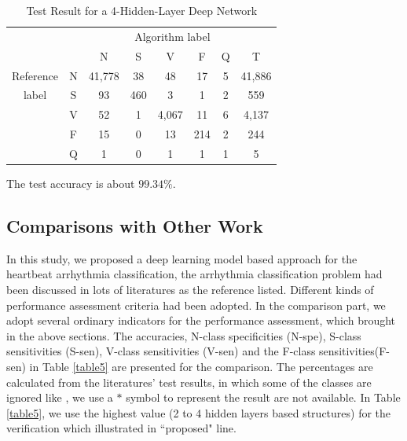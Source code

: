 \documentclass[journal]{IEEEtran}
\begin{document}
\begin{table}[!htbp]
\begin{center}
\begin{threeparttable}
\caption{Test Result for a 4-Hidden-Layer Deep Network}
\label{table4}
\begin{tabular}{cccccccc}
\hline
\multicolumn{6}{r}{Algorithm label} \\
\cline{3-7}
		&  & N & S      & V    & F     & Q   & T\\
\hline
 Reference & N & 41,778 &  38  &  48   & 17  & 5  &  41,886 \\
	label  & S &  93    & 460  &   3   & 1   & 2  &  559\\
		   & V &  52    & 1    & 4,067 & 11  & 6  &  4,137\\
		   & F &  15    & 0    & 13    & 214 & 2  &  244\\
		   & Q &  1     & 0    & 1     & 1   & 1  &  5\\
\hline
\end{tabular}
\begin{tablenotes}
\item The test accuracy is about $99.34\%$.
\end{tablenotes}
\end{threeparttable}
\end{center}
\end{table}


\subsection{Comparisons with Other Work}
In this study, we proposed a deep learning model based approach for the heartbeat arrhythmia classification, the arrhythmia classification problem had been discussed in lots of literatures as the reference listed. Different kinds of performance assessment criteria had been adopted. In the comparison part, we adopt several ordinary indicators for the performance assessment, which brought in the above sections. The accuracies, N-class specificities (N-spe), S-class sensitivities (S-sen), V-class sensitivities (V-sen) and the F-class sensitivities(F-sen) in Table \ref{table5} are presented for the comparison. The percentages are calculated from the literatures' test results, in which some of the classes are ignored like \cite{melgan}, we use a $*$ symbol to represent the result are not available. 
In Table \ref{table5}, we use the highest value (2 to 4 hidden layers based structures) for the verification which illustrated in ``proposed" line.
\end{document}
